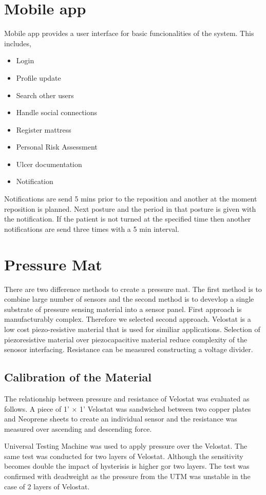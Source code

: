 \section{Mobile app} 

Mobile app provides a user interface for basic funcionalities of the system. This includes,
\begin{itemize}
	\item Login
	\item Profile update
	\item Search other users
	\item Handle social connections
	\item Register mattress
	\item Personal Risk Assessment
	\item Ulcer documentation
	\item Notification
\end{itemize}

Notifications are  send 5  mins prior to the reposition and another at the moment reposition is planned. Next posture and the period in that posture is given with the notification. If the patient is not turned at the specified time then another notifications are send three times with a 5 min interval.


\section{Pressure Mat}

There are two difference methods to create a pressure mat. The first method is to combine large number of sensors and the second method is to devevlop a single substrate of pressure sensing material into a sensor panel. First approach is manufacturably complex. Therefore we selected second approach. Velostat\textsuperscript{\textregistered} is a low cost piezo-resistive material that is used for similiar applications. Selection of piezoresistive material over piezocapacitive material reduce complexity of the senosor interfacing. Resistance can be measured constructing a voltage divider. 


\subsection{Calibration of the Material}

The relationship between pressure and resistance of Velostat was evaluated as follows. A piece of 1' $\times$ 1' Velostat was sandwiched between two copper plates and Neoprene sheets to create an individual sensor and the resistance was measured over ascending and descending force. 

 Universal Testing Machine was used to apply pressure over the Velostat. The same test was conducted for two layers of Velostat. Although the sensitivity becomes double the impact of hysterisis is higher gor two layers. The test was confirmed with deadweight as the pressure from the UTM was unstable in the case of 2 layers of Velostat.

